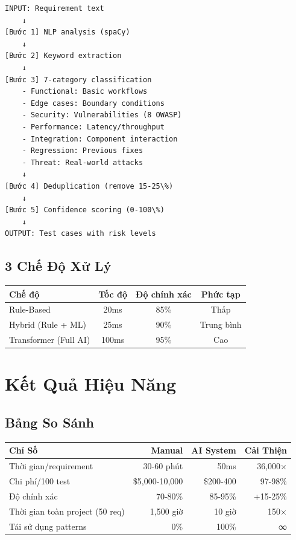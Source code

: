 \documentclass[12pt,a4paper]{report}
\begin{document}
\begin{verbatim}
INPUT: Requirement text
    ↓
[Bước 1] NLP analysis (spaCy)
    ↓
[Bước 2] Keyword extraction
    ↓
[Bước 3] 7-category classification
    - Functional: Basic workflows
    - Edge cases: Boundary conditions
    - Security: Vulnerabilities (8 OWASP)
    - Performance: Latency/throughput
    - Integration: Component interaction
    - Regression: Previous fixes
    - Threat: Real-world attacks
    ↓
[Bước 4] Deduplication (remove 15-25\%)
    ↓
[Bước 5] Confidence scoring (0-100\%)
    ↓
OUTPUT: Test cases with risk levels
\end{verbatim}

\section{3 Chế Độ Xử Lý}

\begin{table}[h]
\centering
\begin{tabular}{|l|c|c|c|}
\hline
\textbf{Chế độ} & \textbf{Tốc độ} & \textbf{Độ chính xác} & \textbf{Phức tạp} \\
\hline
Rule-Based & 20ms & 85\% & Thấp \\
\hline
Hybrid (Rule + ML) & 25ms & 90\% & Trung bình \\
\hline
Transformer (Full AI) & 100ms & 95\% & Cao \\
\hline
\end{tabular}
\end{table}

\chapter{Kết Quả Hiệu Năng}

\section{Bảng So Sánh}

\begin{table}[h]
\centering
\begin{tabular}{|l|r|r|r|}
\hline
\textbf{Chỉ Số} & \textbf{Manual} & \textbf{AI System} & \textbf{Cải Thiện} \\
\hline
Thời gian/requirement & 30-60 phút & 50ms & 36,000× \\
\hline
Chi phí/100 test & \$5,000-10,000 & \$200-400 & 97-98\% \\
\hline
Độ chính xác & 70-80\% & 85-95\% & +15-25\% \\
\hline
Thời gian toàn project (50 req) & 1,500 giờ & 10 giờ & 150× \\
\hline
Tái sử dụng patterns & 0\% & 100\% & ∞ \\
\hline
\end{tabular}
\end{table}
\end{document}
